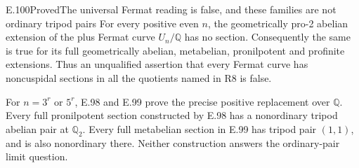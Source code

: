 \begin{result}{E.100}{Proved}{The universal Fermat reading is false, and these families are not ordinary tripod pairs}
For every positive even \(n\), the geometrically pro-2 abelian
extension of the plus Fermat curve \(U_n/\mathbb Q\) has no section.
Consequently the same is true for its full geometrically abelian,
metabelian, pronilpotent and profinite extensions.  Thus an
unqualified assertion that every Fermat curve has noncuspidal
sections in all the quotients named in R8 is false.

For \(n=3^r\) or \(5^r\), E.98 and E.99 prove the precise positive
replacement over \(\mathbb Q\).  Every full pronilpotent section
constructed by E.98 has a nonordinary tripod abelian pair at
\(\mathbb Q_2\).  Every full metabelian section in E.99 has tripod
pair \((1,1)\), and is also nonordinary there.  Neither construction
answers the ordinary-pair limit question.
\end{result}
